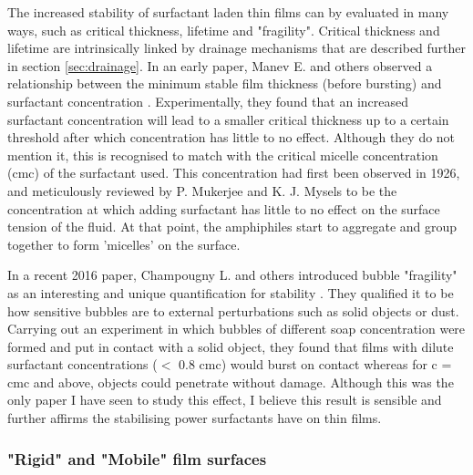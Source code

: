 \documentclass[a4paper,12pt]{article}
\numberwithin{equation}{section}
\numberwithin{figure}{section}
\numberwithin{table}{section}
\begin{document}
The increased stability of surfactant laden thin films can by evaluated in many ways, such as critical thickness, lifetime and "fragility". Critical thickness and lifetime are intrinsically linked by drainage mechanisms that are described further in section \ref{sec:drainage}. In an early paper, Manev E. and others observed a relationship between the minimum stable film thickness (before bursting) and surfactant concentration \cite{Manev1974}. Experimentally, they found that an increased surfactant concentration will lead to a smaller critical thickness up to a certain threshold after which concentration has little to no effect. Although they do not mention it, this is recognised to match with the critical micelle concentration (cmc) of the surfactant used. This concentration had first been observed in 1926, and meticulously reviewed by P. Mukerjee and K. J. Mysels \cite{Mukerjee1971} to be the concentration at which adding surfactant has little to no effect on the surface tension of the fluid. At that point, the amphiphiles start to aggregate and group together to form 'micelles' on the surface. %

In a recent 2016 paper, Champougny L. and others introduced bubble "fragility" as an interesting and unique quantification for stability \cite{ChampougnyNotBare2016}. They qualified it to be how sensitive bubbles are to external perturbations such as solid objects or dust. Carrying out an experiment in which bubbles of different soap concentration were formed and put in contact with a solid object, they found that films with dilute surfactant concentrations ($<$ 0.8 cmc) would burst on contact whereas for c = cmc and above, objects could penetrate without damage. Although this was the only paper I have seen to study this effect, I believe this result is sensible and further affirms the stabilising power surfactants have on thin films.


\subsubsection{"Rigid" and "Mobile" film surfaces}
\label{sec:RigidMobile}
\end{document}
